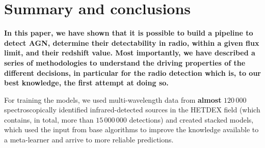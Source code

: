 \documentclass{aa}
\begin{document}




 
\section{Summary and conclusions}\label{sec:summary_conclusions}


\textbf{In this paper, we have shown that it is possible to build a pipeline to detect AGN, determine their detectability in radio, within a given flux limit, and their redshift \textbf{value}. Most importantly, we have described a series of methodologies to understand the driving properties of the different decisions, in particular \textbf{for} the radio \textbf{detection} which is, to our best knowledge, the first attempt at doing so. }

For training the models, we used multi-wavelength data from \textbf{almost} \textbf{$120\,000$} spectroscopically identified infrared-detected sources in the HETDEX field (which contains, in total, more than \textbf{$15\,000\,000$} detections) and created stacked models, which used the input from base algorithms to improve the knowledge available to a meta-learner and arrive to more reliable predictions.
\end{document}
